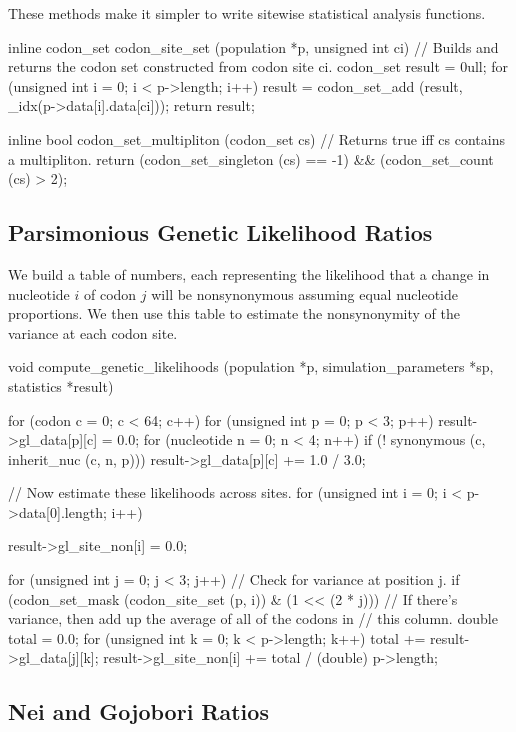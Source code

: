 \documentclass{article}
\begin{document}
      These methods make it simpler to write sitewise statistical analysis
      functions.

\begin{ccode}
inline codon_set codon_site_set (population *p, unsigned int ci) {
  // Builds and returns the codon set constructed from codon site ci.
  codon_set result = 0ull;
  for (unsigned int i = 0; i < p->length; i++)
    result = codon_set_add (result, _idx(p->data[i].data[ci]));
  return result;
}

inline bool codon_set_multipliton (codon_set cs) {
  // Returns true iff cs contains a multipliton.
  return (codon_set_singleton (cs) == -1) && (codon_set_count (cs) > 2);
}
\end{ccode}

    \subsection{Parsimonious Genetic Likelihood Ratios}
      \label{sec:genetic-likelihoods}

      We build a table of numbers, each representing the likelihood that a
      change in nucleotide $i$ of codon $j$ will be nonsynonymous assuming equal
      nucleotide proportions. We then use this table to estimate the
      nonsynonymity of the variance at each codon site.

\begin{ccode}
void compute_genetic_likelihoods (population *p, simulation_parameters *sp, statistics *result) {
  for (codon c = 0; c < 64; c++)
    for (unsigned int p = 0; p < 3; p++) {
      result->gl_data[p][c] = 0.0;
      for (nucleotide n = 0; n < 4; n++)
	if (! synonymous (c, inherit_nuc (c, n, p)))
	  result->gl_data[p][c] += 1.0 / 3.0;
    }

  // Now estimate these likelihoods across sites.
  for (unsigned int i = 0; i < p->data[0].length; i++) {
    result->gl_site_non[i] = 0.0;

    for (unsigned int j = 0; j < 3; j++)
      // Check for variance at position j.
      if (codon_set_mask (codon_site_set (p, i)) & (1 << (2 * j))) {
	// If there's variance, then add up the average of all of the codons in
	// this column.
	double total = 0.0;
	for (unsigned int k = 0; k < p->length; k++)
	  total += result->gl_data[j][k];
	result->gl_site_non[i] += total / (double) p->length;
      }
  }
}
\end{ccode}

    \subsection{Nei and Gojobori Ratios}
      \label{sec:nei-gojobori}
\end{document}

